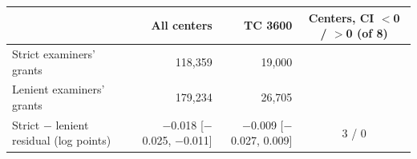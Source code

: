 \begin{tabular}{lrrc}
\toprule
 & All centers & TC 3600 & Centers, CI $<$0 / $>$0 (of 8) \\
\midrule
Strict examiners' grants & 118,359 & 19,000 &  \\
Lenient examiners' grants & 179,234 & 26,705 &  \\
Strict $-$ lenient residual (log points) & $-$0.018 [$-$0.025, $-$0.011] & $-$0.009 [$-$0.027, 0.009] & 3 / 0 \\
\bottomrule
\end{tabular}
